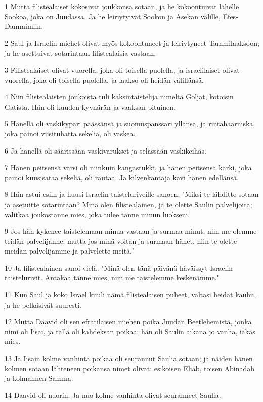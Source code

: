 \par 1 Mutta filistealaiset kokosivat joukkonsa sotaan, ja he kokoontuivat lähelle Sookoa, joka on Juudassa. Ja he leiriytyivät Sookon ja Asekan välille, Efes-Dammimiin.
\par 2 Saul ja Israelin miehet olivat myös kokoontuneet ja leiriytyneet Tammilaaksoon; ja he asettuivat sotarintaan filistealaisia vastaan.
\par 3 Filistealaiset olivat vuorella, joka oli toisella puolella, ja israelilaiset olivat vuorella, joka oli toisella puolella, ja laakso oli heidän välillänsä.
\par 4 Niin filistealaisten joukoista tuli kaksintaistelija nimeltä Goljat, kotoisin Gatista. Hän oli kuuden kyynärän ja vaaksan pituinen.
\par 5 Hänellä oli vaskikypäri päässänsä ja suomuspanssari yllänsä, ja rintahaarniska, joka painoi viisituhatta sekeliä, oli vaskea.
\par 6 Ja hänellä oli säärissään vaskivarukset ja selässään vaskikeihäs.
\par 7 Hänen peitsensä varsi oli niinkuin kangastukki, ja hänen peitsensä kärki, joka painoi kuusisataa sekeliä, oli rautaa. Ja kilvenkantaja kävi hänen edellänsä.
\par 8 Hän astui esiin ja huusi Israelin taisteluriveille sanoen: "Miksi te lähditte sotaan ja asetuitte sotarintaan? Minä olen filistealainen, ja te olette Saulin palvelijoita; valitkaa joukostanne mies, joka tulee tänne minun luokseni.
\par 9 Jos hän kykenee taistelemaan minua vastaan ja surmaa minut, niin me olemme teidän palvelijanne; mutta jos minä voitan ja surmaan hänet, niin te olette meidän palvelijamme ja palvelette meitä."
\par 10 Ja filistealainen sanoi vielä: "Minä olen tänä päivänä häväissyt Israelin taistelurivit. Antakaa tänne mies, niin me taistelemme keskenämme."
\par 11 Kun Saul ja koko Israel kuuli nämä filistealaisen puheet, valtasi heidät kauhu, ja he pelkäsivät suuresti.
\par 12 Mutta Daavid oli sen efratilaisen miehen poika Juudan Beetlehemistä, jonka nimi oli Iisai, ja tällä oli kahdeksan poikaa; hän oli Saulin aikana jo vanha, iäkäs mies.
\par 13 Ja Iisain kolme vanhinta poikaa oli seurannut Saulia sotaan; ja näiden hänen kolmen sotaan lähteneen poikansa nimet olivat: esikoisen Eliab, toisen Abinadab ja kolmannen Samma.
\par 14 Daavid oli nuorin. Ja nuo kolme vanhinta olivat seuranneet Saulia.
